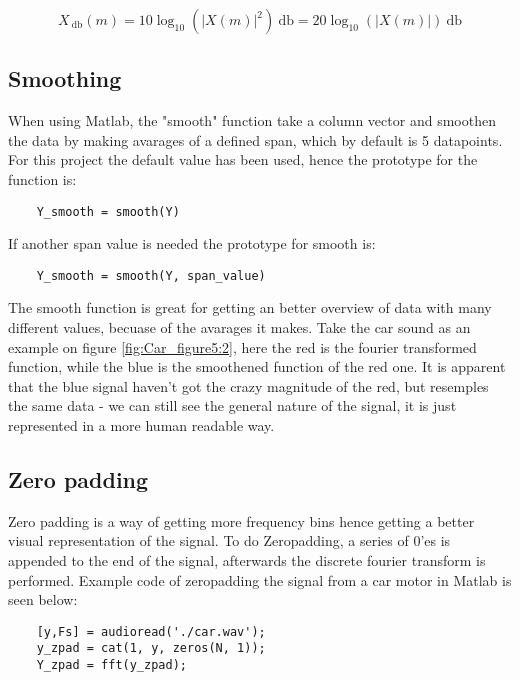 \begin{equation}
X_{\SI{}{\decibel}}(m) = 10\log_{10}(|X(m)|^2)\SI{}{\decibel} = 20\log_{10}(|X(m)|)\SI{}{\decibel}
\end{equation}

\subsection{Smoothing}

When using Matlab, the "smooth" function take a column vector and smoothen the data by making avarages of a defined span, which by default is 5 datapoints\cite[smooth]{MATLAB_DOC}. 
For this project the default value has been used, hence the prototype for the function is:

\begin{verbatim}
	Y_smooth = smooth(Y)
\end{verbatim}
If another span value is needed the prototype for smooth is:


\begin{verbatim}
	Y_smooth = smooth(Y, span_value)
\end{verbatim}

The smooth function is great for getting an better overview of data with many different values, becuase of the avarages it makes. 
Take the car sound as an example on figure \ref{fig:Car_figure5:2}, here the red is the fourier transformed function, while the blue is the smoothened function of the red one. 
It is apparent that the blue signal haven't got the crazy magnitude of the red, but resemples the same data - we can still see the general nature of the signal, it is just represented in a more human readable way.

\subsection{Zero padding}

Zero padding is a way of getting more frequency bins hence getting a better visual representation of the signal. 
To do Zeropadding, a series of 0'es is appended to the end of the signal, afterwards the discrete fourier transform is performed. 
Example code of zeropadding the signal from a car motor in Matlab is seen below:

\begin{verbatim}
	[y,Fs] = audioread('./car.wav');
	y_zpad = cat(1, y, zeros(N, 1));
	Y_zpad = fft(y_zpad);
\end{verbatim}

